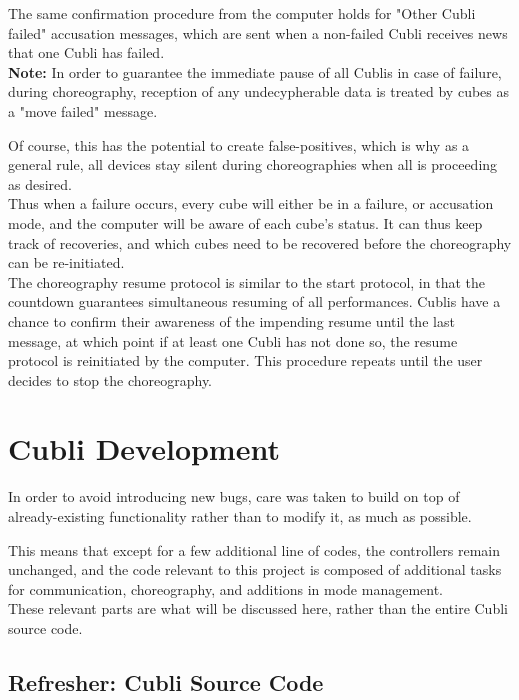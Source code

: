 \begin{itemize}
The same confirmation procedure from the computer holds for "Other Cubli failed" accusation messages, which are sent when a non-failed Cubli receives news that one Cubli has failed.\\

\textbf{Note:} In order to guarantee the immediate pause of all Cublis in case of failure, during choreography, reception of any undecypherable data is treated by cubes as a "move failed" message.

Of course, this has the potential to create false-positives, which is why as a general rule, all devices stay silent during choreographies when all is proceeding as desired.\\

Thus when a failure occurs, every cube will either be in a failure, or accusation mode, and the computer will be aware of each cube's status. It can thus keep track of recoveries, and which cubes need to be recovered before the choreography can be re-initiated.\\

The choreography resume protocol is similar to the start protocol, in that the countdown guarantees simultaneous resuming of all performances. Cublis have a chance to confirm their awareness of the impending resume until the last message, at which point if at least one Cubli has not done so, the resume protocol is reinitiated by the computer. This procedure repeats until the user decides to stop the choreography.




\end{itemize}

\section{Cubli Development}

In order to avoid introducing new bugs, care was taken to build on top of already-existing functionality rather than to modify it, as much as possible.

This means that except for a few additional line of codes, the controllers remain unchanged, and the code relevant to this project is composed of additional tasks for communication, choreography, and additions in mode management.\\

These relevant parts are what will be discussed here, rather than the entire Cubli source code.

\subsection{Refresher: Cubli Source Code }

